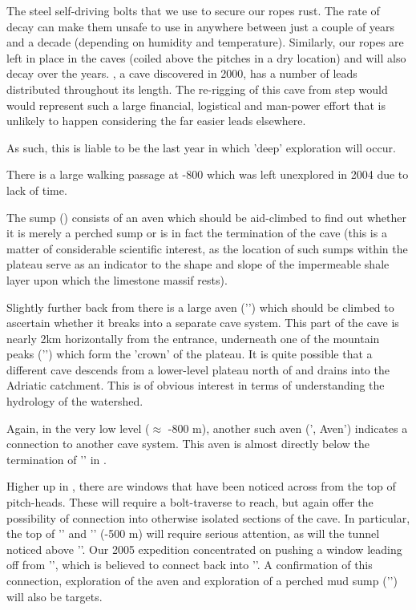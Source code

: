 The steel self-driving bolts that we use to secure our ropes rust. The rate of decay can make them unsafe to use in anywhere between just a couple of years and a decade (depending on humidity and temperature). Similarly, our ropes are left in place in the caves (coiled above the pitches in a dry location) and will also decay over the years. , a cave discovered in 2000, has a number of leads distributed throughout its length. The re-rigging of this cave from step would would represent such a large financial, logistical and man-power effort that is unlikely to happen considering the far easier leads elsewhere.

As such, this is liable to be the last year in which 'deep' exploration will occur.

There is a large walking passage at -800 which was left unexplored in 2004 due to lack of time.

The sump () consists of an aven which should be aid-climbed to find out whether it is merely a perched sump or is in fact the  termination of the cave (this is a matter of considerable scientific interest, as the location of such sumps within the  plateau serve as an indicator to the shape and slope of the impermeable shale layer upon which the limestone massif rests).

Slightly further back from  there is a large aven ('') which should be climbed to ascertain whether it breaks into a separate cave system. This part of the cave is nearly 2km horizontally from the entrance, underneath one of the mountain peaks ('') which form the 'crown' of the plateau. It is quite possible that a different cave descends from a lower-level plateau north of  and drains into the Adriatic catchment. This is of obvious interest in terms of understanding the hydrology of the watershed.

Again, in the very low level ($\approx$ -800 m), another such aven (', Aven') indicates a connection to another cave system. This aven is almost directly below the termination of '' in .

Higher up in , there are windows that have been noticed across from the top of pitch-heads. These will require a bolt-traverse to reach, but again offer the possibility of connection into otherwise isolated sections of the cave. In particular, the top of '' and '' (-500 m) will require serious attention, as will the tunnel noticed above ''.
Our 2005 expedition concentrated on pushing a window leading off from '', which is believed to connect back into ''. A confirmation of this connection, exploration of the  aven and exploration of a perched mud sump ('') will also be targets.

